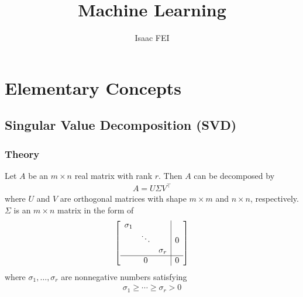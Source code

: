 \documentclass[color=blue, thmcnt=section, 12pt]{elegantbook}
\title{Machine Learning}
\author{Isaac FEI}
\begin{document}
\maketitle

\frontmatter
\tableofcontents
\mainmatter





\part{Elementary Concepts}







\chapter{Singular Value Decomposition (SVD)}


\section{Theory}


\begin{theorem}
    Let $A$ be an $m \times n$ real matrix with rank $r$. Then $A$ can be decomposed by 
    \begin{align*}
        A = U \Sigma V^\top
    \end{align*}
    where $U$ and $V$ are orthogonal matrices with shape $m \times m$ and $n \times n$, respectively. $\Sigma$ is an $m \times n$ matrix in the form of
    \begin{align*}
        \left[ \begin{array}{ccc|c}
            \sigma_1 &  & & \\ 
            & \ddots & & 0 \\ 
            & & \sigma_r & \\ 
            \hline
            & 0 & & 0
        \end{array} \right]
    \end{align*}
    where $\sigma_1, \ldots, \sigma_r$ are nonnegative numbers satisfying
    \begin{align*}
        \sigma_1 \geq \cdots \geq \sigma_r > 0
    \end{align*}
\end{theorem}
\end{document}
